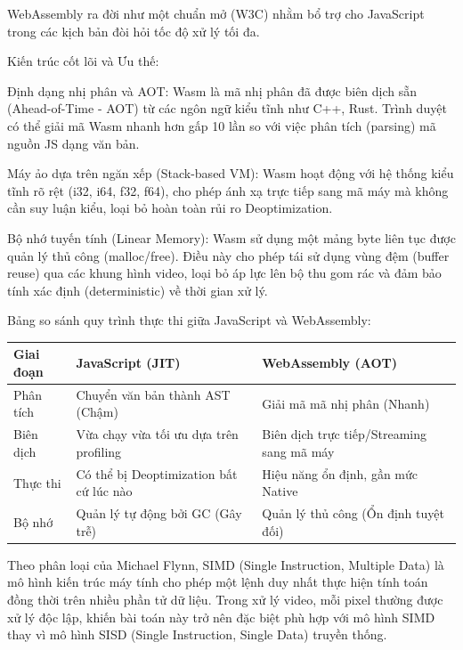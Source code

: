 WebAssembly ra đời như một chuẩn mở (W3C) nhằm bổ trợ cho JavaScript trong các kịch bản đòi hỏi tốc độ xử lý tối đa.


Kiến trúc cốt lõi và Ưu thế:


Định dạng nhị phân và AOT: Wasm là mã nhị phân đã được biên dịch sẵn (Ahead-of-Time - AOT) từ các ngôn ngữ kiểu tĩnh như C++, Rust. Trình duyệt có thể giải mã Wasm nhanh hơn gấp 10 lần so với việc phân tích (parsing) mã nguồn JS dạng văn bản.


Máy ảo dựa trên ngăn xếp (Stack-based VM): Wasm hoạt động với hệ thống kiểu tĩnh rõ rệt (i32, i64, f32, f64), cho phép ánh xạ trực tiếp sang mã máy mà không cần suy luận kiểu, loại bỏ hoàn toàn rủi ro Deoptimization.


Bộ nhớ tuyến tính (Linear Memory): Wasm sử dụng một mảng byte liên tục được quản lý thủ công (malloc/free). Điều này cho phép tái sử dụng vùng đệm (buffer reuse) qua các khung hình video, loại bỏ áp lực lên bộ thu gom rác và đảm bảo tính xác định (deterministic) về thời gian xử lý.


Bảng so sánh quy trình thực thi giữa JavaScript và WebAssembly:


\begin{center}
\small
\renewcommand{\arraystretch}{1.2}
\begin{tabularx}{\textwidth}{|>{\raggedright\arraybackslash}X|>{\raggedright\arraybackslash}X|>{\raggedright\arraybackslash}X|}
\hline
\textbf{Giai đoạn} & \textbf{JavaScript (JIT)} & \textbf{WebAssembly (AOT)} \\
\hline
Phân tích & Chuyển văn bản thành AST (Chậm) & Giải mã mã nhị phân (Nhanh) \\
\hline
Biên dịch & Vừa chạy vừa tối ưu dựa trên profiling & Biên dịch trực tiếp/Streaming sang mã máy \\
\hline
Thực thi & Có thể bị Deoptimization bất cứ lúc nào & Hiệu năng ổn định, gần mức Native \\
\hline
Bộ nhớ & Quản lý tự động bởi GC (Gây trễ) & Quản lý thủ công (Ổn định tuyệt đối) \\
\hline
\end{tabularx}
\end{center}
\normalsize



Theo phân loại của Michael Flynn, SIMD (Single Instruction, Multiple Data) là mô hình kiến trúc máy tính cho phép một lệnh duy nhất thực hiện tính toán đồng thời trên nhiều phần tử dữ liệu. Trong xử lý video, mỗi pixel thường được xử lý độc lập, khiến bài toán này trở nên đặc biệt phù hợp với mô hình SIMD thay vì mô hình SISD (Single Instruction, Single Data) truyền thống.


